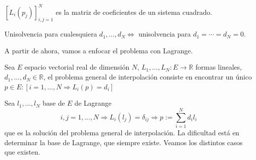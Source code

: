 $\left[ L_i(p_j) \right] _{i,j=1}^N$ es la matriz de coeficientes de un sistema cuadrado.

Unisolvencia para cualesquiera $d_1,...,d_N \Leftrightarrow$ unisolvencia para $d_1 = \cdots = d_N = 0$.

A partir de ahora, vamos a enfocar el problema con Lagrange.

Sea $E$ espacio vectorial real de dimensión $N$, $L_1,...,L_N : E \longrightarrow \mathbb{R}$ formas lineales, $d_1,...,d_N \in \mathbb{R}$, el problema general de interpolación consiste en encontrar un único $p \in E : \left[  i=1,...,N \Rightarrow L_i(p) = d_i \right]$

Sea {$l_1,...,l_N$} base de $E$ de Lagrange
\[ i,j = 1,...,N \Rightarrow L_i(l_j) = \delta _{ij} \Rightarrow p:= \sum_{i=1}^N d_il_i \]
que es la solución del problema general de interpolación. La dificultad está en determinar la base de Lagrange, que siempre existe. Veamos los distintos casos que existen.

